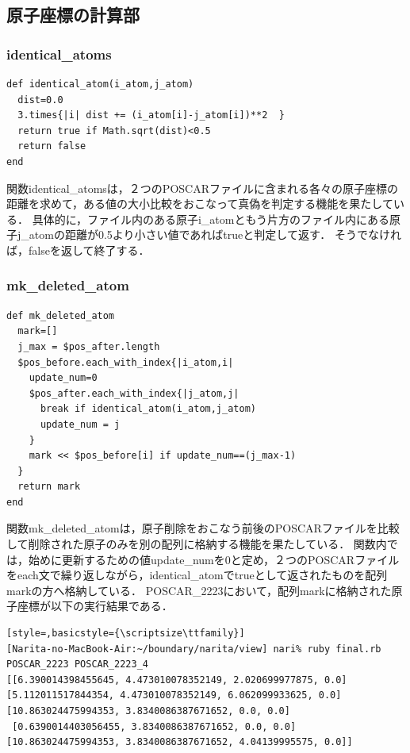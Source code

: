 \subsection{原子座標の計算部}
\subsubsection{identical\_atoms}\begin{lstlisting}[style=customRuby,basicstyle={\scriptsize\ttfamily}]
def identical_atom(i_atom,j_atom)
  dist=0.0
  3.times{|i| dist += (i_atom[i]-j_atom[i])**2  }
  return true if Math.sqrt(dist)<0.5
  return false
end
\end{lstlisting}
関数identical\_atomsは，２つのPOSCARファイルに含まれる各々の原子座標の距離を求めて，ある値の大小比較をおこなって真偽を判定する機能を果たしている．
具体的に，ファイル内のある原子i\_atomともう片方のファイル内にある原子j\_atomの距離が0.5より小さい値であればtrueと判定して返す．
そうでなければ，falseを返して終了する．

\subsubsection{mk\_deleted\_atom}\begin{lstlisting}[style=customRuby,basicstyle={\scriptsize\ttfamily}]
def mk_deleted_atom
  mark=[]
  j_max = $pos_after.length
  $pos_before.each_with_index{|i_atom,i|
    update_num=0
    $pos_after.each_with_index{|j_atom,j|
      break if identical_atom(i_atom,j_atom)
      update_num = j
    }
    mark << $pos_before[i] if update_num==(j_max-1)
  }
  return mark
end
\end{lstlisting}
関数mk\_deleted\_atomは，原子削除をおこなう前後のPOSCARファイルを比較して削除された原子のみを別の配列に格納する機能を果たしている．
関数内では，始めに更新するための値update\_numを0と定め，２つのPOSCARファイルをeach文で繰り返しながら，identical\_atomでtrueとして返されたものを配列markの方へ格納している．
POSCAR\_2223において，配列markに格納された原子座標が以下の実行結果である．
\begin{lstlisting}[style=,basicstyle={\scriptsize\ttfamily}]
[Narita-no-MacBook-Air:~/boundary/narita/view] nari% ruby final.rb POSCAR_2223 POSCAR_2223_4
[[6.390014398455645, 4.473010078352149, 2.020699977875, 0.0] 
[5.112011517844354, 4.473010078352149, 6.062099933625, 0.0] 
[10.863024475994353, 3.8340086387671652, 0.0, 0.0]
 [0.6390014403056455, 3.8340086387671652, 0.0, 0.0] 
[10.863024475994353, 3.8340086387671652, 4.04139995575, 0.0]]
\end{lstlisting}
